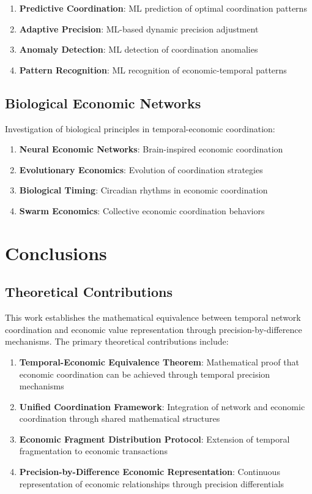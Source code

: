 \documentclass[12pt,a4paper]{article}
\begin{document}
\begin{enumerate}
\item \textbf{Predictive Coordination}: ML prediction of optimal coordination patterns
\item \textbf{Adaptive Precision}: ML-based dynamic precision adjustment
\item \textbf{Anomaly Detection}: ML detection of coordination anomalies
\item \textbf{Pattern Recognition}: ML recognition of economic-temporal patterns
\end{enumerate}

\subsection{Biological Economic Networks}

Investigation of biological principles in temporal-economic coordination:

\begin{enumerate}
\item \textbf{Neural Economic Networks}: Brain-inspired economic coordination
\item \textbf{Evolutionary Economics}: Evolution of coordination strategies
\item \textbf{Biological Timing}: Circadian rhythms in economic coordination
\item \textbf{Swarm Economics}: Collective economic coordination behaviors
\end{enumerate}

\section{Conclusions}

\subsection{Theoretical Contributions}

This work establishes the mathematical equivalence between temporal network coordination and economic value representation through precision-by-difference mechanisms. The primary theoretical contributions include:

\begin{enumerate}
\item \textbf{Temporal-Economic Equivalence Theorem}: Mathematical proof that economic coordination can be achieved through temporal precision mechanisms
\item \textbf{Unified Coordination Framework}: Integration of network and economic coordination through shared mathematical structures
\item \textbf{Economic Fragment Distribution Protocol}: Extension of temporal fragmentation to economic transactions
\item \textbf{Precision-by-Difference Economic Representation}: Continuous representation of economic relationships through precision differentials
\end{enumerate}
\end{document}
